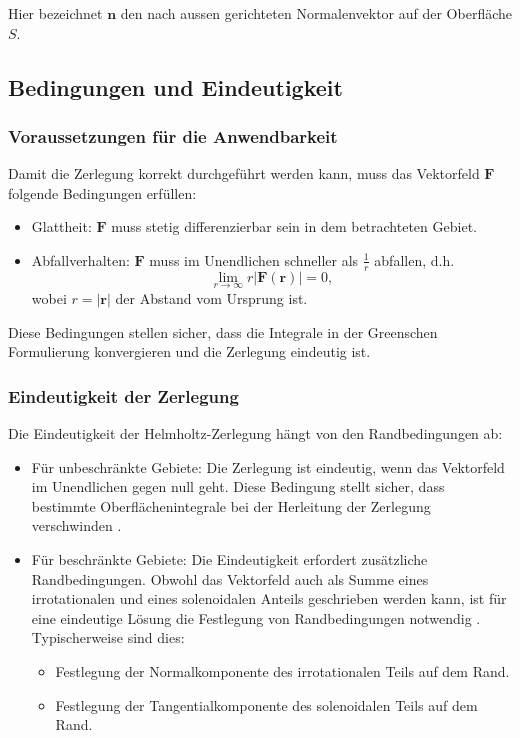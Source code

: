 \noindent Hier bezeichnet $\mathbf{n}$ den nach aussen gerichteten Normalenvektor auf der Oberfläche $S$.

\subsection{Bedingungen und Eindeutigkeit
\label{helmholtz:subsection:Bedingungen_Eindeutigkeit}}

\subsubsection{Voraussetzungen für die Anwendbarkeit}
Damit die Zerlegung korrekt durchgeführt werden kann, muss das Vektorfeld $\mathbf{F}$ folgende Bedingungen erfüllen:

\begin{itemize}
\item Glattheit: $\mathbf{F}$ muss stetig differenzierbar sein in dem betrachteten Gebiet.
\item Abfallverhalten: $\mathbf{F}$ muss im Unendlichen schneller als $\frac{1}{r}$ abfallen, d.h.
\begin{equation}
\lim_{r \to \infty} r|\mathbf{F}(\mathbf{r})| = 0,
\end{equation}
wobei $r = |\mathbf{r}|$ der Abstand vom Ursprung ist.
\end{itemize}

\noindent Diese Bedingungen stellen sicher, dass die Integrale in der Greenschen Formulierung konvergieren und die Zerlegung eindeutig ist.

\subsubsection{Eindeutigkeit der Zerlegung
\label{helmholtz:subsection:Bedingungen_onlyEindeutigkeit}}

Die Eindeutigkeit der Helmholtz-Zerlegung hängt von den Randbedingungen ab:

\begin{itemize}
\item Für unbeschränkte Gebiete: Die Zerlegung ist eindeutig, wenn das Vektorfeld im Unendlichen gegen null geht. Diese Bedingung stellt sicher, dass bestimmte Oberflächenintegrale bei der Herleitung der Zerlegung verschwinden \cite{wiki:helmholtz}.

\item Für beschränkte Gebiete: Die Eindeutigkeit erfordert zusätzliche Randbedingungen. Obwohl das Vektorfeld auch als Summe eines irrotationalen und eines solenoidalen Anteils geschrieben werden kann, ist für eine eindeutige Lösung die Festlegung von Randbedingungen notwendig \cite{wiki:helmholtz}. Typischerweise sind dies:
  \begin{itemize}
    \item Festlegung der Normalkomponente des irrotationalen Teils auf dem Rand.
    \item Festlegung der Tangentialkomponente des solenoidalen Teils auf dem Rand.
  \end{itemize}
\end{itemize}

